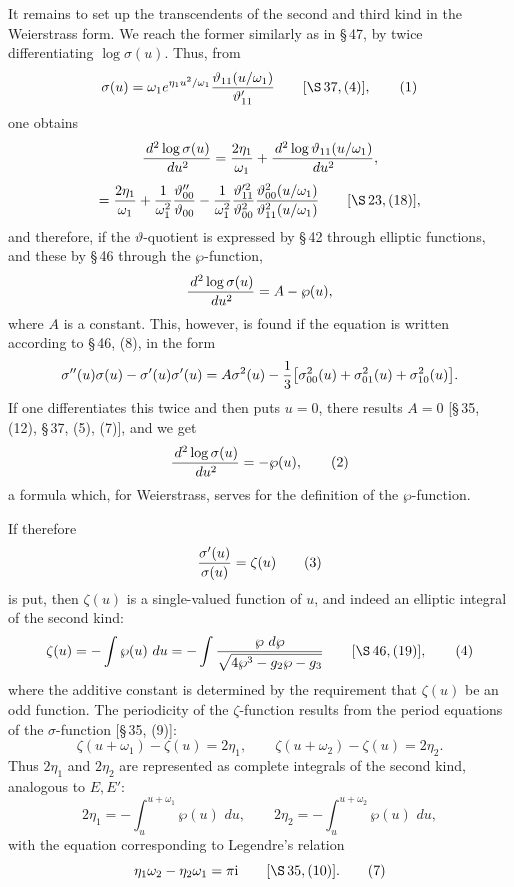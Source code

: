 \documentclass[11pt]{article}
\providecommand{\dd}{\,d}
\providecommand{\tht}{\vartheta}
\providecommand{\ii}{\mathrm{i}}
\begin{document}
It remains to set up the transcendents of the second and third kind in the Weierstrass form. We reach the former similarly as in \S\,47, by twice differentiating $\log\sigma(u)$. Thus, from
\begin{equation}
\sigma(u)=\omega_1 e^{\eta_1u^2/\omega_1}{\tht_{11}(u/\omega_1)\over\tht_{11}'}
\qquad[\S\,37,(4)],
\tag{1}
\end{equation}
one obtains
\[
{\dd^2\log\sigma(u)\over\dd u^2}
={2\eta_1\over\omega_1}+{\dd^2\log\tht_{11}(u/\omega_1)\over\dd u^2},
\]
\[
={2\eta_1\over\omega_1}+{1\over\omega_1^2}{\tht_{00}''\over\tht_{00}}
-{1\over\omega_1^2}{\tht_{11}'^{2}\over\tht_{00}^{2}}
{\tht_{00}^{2}(u/\omega_1)\over\tht_{11}^{2}(u/\omega_1)}
\qquad[\S\,23,(18)],
\]
and therefore, if the $\vartheta$-quotient is expressed by \S\,42 through elliptic functions, and these by \S\,46 through the $\wp$-function,
\[
{\dd^2\log\sigma(u)\over\dd u^2}=A-\wp(u),
\]
where $A$ is a constant. This, however, is found if the equation is written according to \S\,46, (8), in the form
\[
\sigma''(u)\sigma(u)-\sigma'(u)\sigma'(u)=A\sigma^2(u)-{1\over3}\bigl[\sigma_{00}^{2}(u)+\sigma_{01}^{2}(u)+\sigma_{10}^{2}(u)\bigr].
\]
If one differentiates this twice and then puts $u=0$, there results $A=0$ [\S\,35, (12), \S\,37, (5), (7)], and we get
\begin{equation}
{\dd^2\log\sigma(u)\over\dd u^2}=-\wp(u),
\tag{2}
\end{equation}
a formula which, for Weierstrass, serves for the definition of the $\wp$-function.

If therefore
\begin{equation}
{\sigma'(u)\over\sigma(u)}=\zeta(u)
\tag{3}
\end{equation}
is put, then $\zeta(u)$ is a single-valued function of $u$, and indeed an elliptic integral of the second kind:
\begin{equation}
\zeta(u)=-\int\wp(u)\,\dd u=-\int {\wp\,\dd\wp\over\sqrt{4\wp^3-g_2\wp-g_3}}
\qquad[\S\,46,(19)],
\tag{4}
\end{equation}
where the additive constant is determined by the requirement that $\zeta(u)$ be an odd function. The periodicity of the $\zeta$-function results from the period equations of the $\sigma$-function [\S\,35, (9)]:
\begin{equation}
\zeta(u+\omega_1)-\zeta(u)=2\eta_1,
\qquad
\zeta(u+\omega_2)-\zeta(u)=2\eta_2.
\tag{5}
\end{equation}
Thus $2\eta_1$ and $2\eta_2$ are represented as complete integrals of the second kind, analogous to $E,E'$:
\begin{equation}
2\eta_1=-\int_u^{u+\omega_1}\wp(u)\,\dd u,
\qquad
2\eta_2=-\int_u^{u+\omega_2}\wp(u)\,\dd u,
\tag{6}
\end{equation}
with the equation corresponding to Legendre's relation
\begin{equation}
\eta_1\omega_2-\eta_2\omega_1=\pi\ii\qquad[\S\,35,(10)].
\tag{7}
\end{equation}
\end{document}
